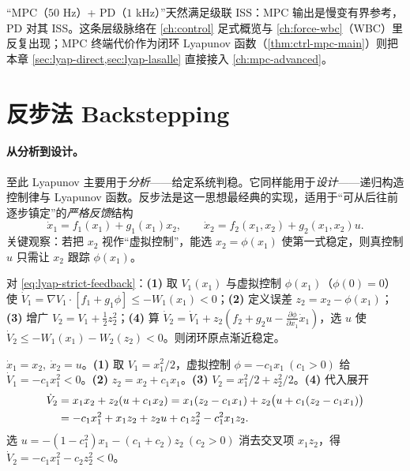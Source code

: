 \noindent “MPC（$50$ Hz）+ PD（$1$ kHz）”天然满足级联 ISS：MPC 输出是慢变有界参考，PD 对其 ISS。这条层级脉络在 \cref{ch:control} 足式概览与 \cref{ch:force-wbc}（WBC）里反复出现；MPC 终端代价作为闭环 Lyapunov 函数（\cref{thm:ctrl-mpc-main}）则把本章 \cref{sec:lyap-direct,sec:lyap-lasalle} 直接接入 \cref{ch:mpc-advanced}。

\section{反步法 Backstepping}
\label{sec:lyap-backstepping}

\paragraph{从分析到设计。}
至此 Lyapunov 主要用于\emph{分析}——给定系统判稳。它同样能用于\emph{设计}——递归构造控制律与 Lyapunov 函数。反步法是这一思想最经典的实现，适用于“可从后往前逐步镇定”的\emph{严格反馈}结构
\begin{equation}
  \dot x_1=f_1(x_1)+g_1(x_1)x_2,\qquad \dot x_2=f_2(x_1,x_2)+g_2(x_1,x_2)u.
  \label{eq:lyap-strict-feedback}
\end{equation}
关键观察：若把 $x_2$ 视作“虚拟控制”，能选 $x_2=\phi(x_1)$ 使第一式稳定，则真控制 $u$ 只需让 $x_2$ 跟踪 $\phi(x_1)$。

\begin{theorem}
\label{thm:lyap-backstepping}
对 \cref{eq:lyap-strict-feedback}：\textbf{(1)} 取 $V_1(x_1)$ 与虚拟控制 $\phi(x_1)$（$\phi(0)=0$）使 $\dot V_1=\nabla V_1\cdot[f_1+g_1\phi]\le-W_1(x_1)<0$；\textbf{(2)} 定义误差 $z_2=x_2-\phi(x_1)$；\textbf{(3)} 增广 $V_2=V_1+\tfrac12 z_2^2$；\textbf{(4)} 算 $\dot V_2=\dot V_1+z_2(f_2+g_2u-\frac{\partial\phi}{\partial x_1}\dot x_1)$，选 $u$ 使 $\dot V_2\le-W_1(x_1)-W_2(z_2)<0$。则闭环原点渐近稳定\cite{krstic1995nonlinear}。
\end{theorem}

\begin{example}[二阶积分器的反步设计]
\label{ex:lyap-backstepping}
$\dot x_1=x_2,\ \dot x_2=u$。\textbf{(1)} 取 $V_1=x_1^2/2$，虚拟控制 $\phi=-c_1x_1\ (c_1>0)$ 给 $\dot V_1=-c_1x_1^2<0$。\textbf{(2)} $z_2=x_2+c_1x_1$。\textbf{(3)} $V_2=x_1^2/2+z_2^2/2$。\textbf{(4)} 代入展开
\begin{align}
  \dot V_2&=x_1x_2+z_2(u+c_1x_2)=x_1(z_2-c_1x_1)+z_2\big(u+c_1(z_2-c_1x_1)\big)\notag\\
  &=-c_1x_1^2+x_1z_2+z_2u+c_1z_2^2-c_1^2x_1z_2.
  \label{eq:lyap-backstep-expand}
\end{align}
选 $u=-(1-c_1^2)x_1-(c_1+c_2)z_2\ (c_2>0)$ 消去交叉项 $x_1z_2$，得 $\dot V_2=-c_1x_1^2-c_2z_2^2<0$。
\end{example}

